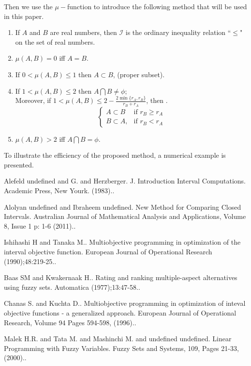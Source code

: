 \documentclass[article,A4,11pt]{llncs}%
\begin{document}
Then we use the $\mu-$function to introduce the following method that will be used in this paper.
            \begin{proposition}
            \begin{enumerate}
            \item If $A$ and $B$ are real numbers, then $\mathscr{I}$ is the  ordinary inequality
            relation ``$\leq$" on the set of real numbers.
            \item $\mu (A,B) = 0 $ iff $A=B$.
            \item If $0 < \mu (A,B) \leq 1 $ then $ A \subset B$, (proper subset).
            \item If $1 < \mu (A,B) \leq 2 $ then $ A \bigcap B\neq \phi$; \\ Moreover,
            if  $1 < \mu (A,B) \leq 2 - \frac{2 \min\{r_A,r_B\}}{r_B+r_A}$, then  .
                  $$\begin{cases}
                   A \subset B   &\textrm{if  $r_B  \geq r_A$}\\
                   B \subset A,&\textrm{if $r_B  < r_A$}
                   \end{cases}$$
            \item $  \mu (A,B) > 2$ iff $ A \bigcap B = \phi$.
            \end{enumerate}
            \end{proposition}
To illustrate the efficiency of the proposed method, a numerical 
example is presented.


\begin{thebibliography}{10}
{\sc Alefeld undefined and G. and Herzberger}. {J. Introduction Interval Computations}.   Academic Press, New Yourk. (1983)..

{\sc Alolyan undefined and Ibraheem undefined}. {New Method for Comparing Closed Intervals}. Australian Journal of Mathematical Analysis and Applications, Volume 8, Issue 1 p: 1-6 (2011)..

{\sc Ishihashi H and Tanaka M.}. {Multiobjective programming in optimization of the interval objective function}. European Journal of Operational Research (1990);48:219-25..

{\sc Baas SM and Kwakernaak H.}. {Rating and ranking multiple-aspect alternatives using fuzzy sets}. Automatica (1977);13:47-58..

{\sc Chanas S. and Kuchta D.}. {Multiobjective programming in optimization of inteval objective functions - a generalized approach}. European Journal of Operational Research, Volume 94 Pages 594-598, (1996)..

{\sc Malek H.R. and Tata M. and Mashinchi M. and undefined undefined}. {Linear Programming with Fuzzy Variables}. Fuzzy Sets and Systems, 109, Pages 21-33, (2000)..
\end{thebibliography}
\end{document}
